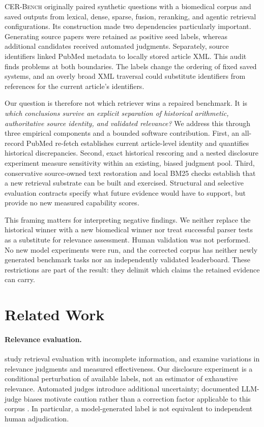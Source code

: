 \documentclass{article}
\newcommand{\cer}{\textsc{CER-Bench}\xspace}
\begin{document}
\cer originally paired synthetic questions with a biomedical corpus and saved outputs from lexical, dense, sparse, fusion, reranking, and agentic retrieval configurations. Its construction made two dependencies particularly important. Generating source papers were retained as positive seed labels, whereas additional candidates received automated judgments. Separately, source identifiers linked PubMed metadata to locally stored article XML. This audit finds problems at both boundaries. The labels change the ordering of fixed saved systems, and an overly broad XML traversal could substitute identifiers from references for the current article's identifiers.

Our question is therefore not which retriever wins a repaired benchmark. It is \emph{which conclusions survive an explicit separation of historical arithmetic, authoritative source identity, and validated relevance?} We address this through three empirical components and a bounded software contribution. First, an all-record PubMed re-fetch establishes current article-level identity and quantifies historical discrepancies. Second, exact historical rescoring and a nested disclosure experiment measure sensitivity within an existing, biased judgment pool. Third, conservative source-owned text restoration and local BM25 checks establish that a new retrieval substrate can be built and exercised. Structural and selective evaluation contracts specify what future evidence would have to support, but provide no new measured capability scores.

This framing matters for interpreting negative findings. We neither replace the historical winner with a new biomedical winner nor treat successful parser tests as a substitute for relevance assessment. Human validation was not performed. No new model experiments were run, and the corrected corpus has neither newly generated benchmark tasks nor an independently validated leaderboard. These restrictions are part of the result: they delimit which claims the retained evidence can carry.

\section{Related Work}
\paragraph{Relevance evaluation.}
\citet{buckley2004incomplete} study retrieval evaluation with incomplete information, and \citet{voorhees2000judgments} examine variations in relevance judgments and measured effectiveness. Our disclosure experiment is a conditional perturbation of available labels, not an estimator of exhaustive relevance. Automated judges introduce additional uncertainty; documented LLM-judge biases motivate caution rather than a correction factor applicable to this corpus \citep{zheng2023judge}. In particular, a model-generated label is not equivalent to independent human adjudication.
\end{document}
